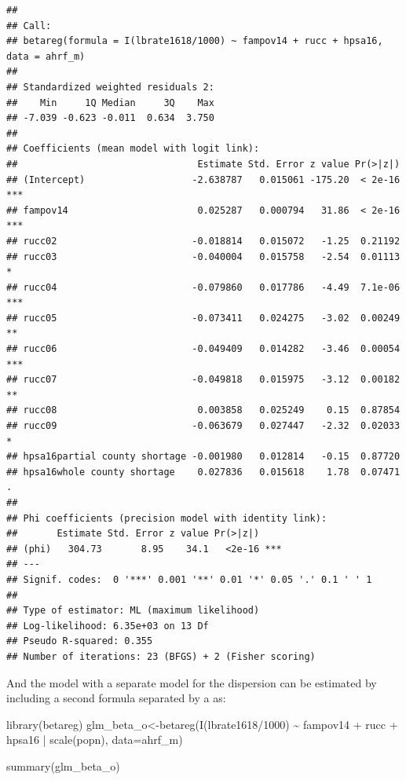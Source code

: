\documentclass[
]{article}
\newenvironment{Shaded}{\begin{snugshade}}{\end{snugshade}}
\newcommand{\AttributeTok}[1]{\textcolor[rgb]{0.77,0.63,0.00}{#1}}
\newcommand{\DecValTok}[1]{\textcolor[rgb]{0.00,0.00,0.81}{#1}}
\newcommand{\FunctionTok}[1]{\textcolor[rgb]{0.00,0.00,0.00}{#1}}
\newcommand{\NormalTok}[1]{#1}
\newcommand{\OtherTok}[1]{\textcolor[rgb]{0.56,0.35,0.01}{#1}}
\newcommand{\SpecialCharTok}[1]{\textcolor[rgb]{0.00,0.00,0.00}{#1}}
\begin{document}
\begin{verbatim}
## 
## Call:
## betareg(formula = I(lbrate1618/1000) ~ fampov14 + rucc + hpsa16, data = ahrf_m)
## 
## Standardized weighted residuals 2:
##    Min     1Q Median     3Q    Max 
## -7.039 -0.623 -0.011  0.634  3.750 
## 
## Coefficients (mean model with logit link):
##                                Estimate Std. Error z value Pr(>|z|)    
## (Intercept)                   -2.638787   0.015061 -175.20  < 2e-16 ***
## fampov14                       0.025287   0.000794   31.86  < 2e-16 ***
## rucc02                        -0.018814   0.015072   -1.25  0.21192    
## rucc03                        -0.040004   0.015758   -2.54  0.01113 *  
## rucc04                        -0.079860   0.017786   -4.49  7.1e-06 ***
## rucc05                        -0.073411   0.024275   -3.02  0.00249 ** 
## rucc06                        -0.049409   0.014282   -3.46  0.00054 ***
## rucc07                        -0.049818   0.015975   -3.12  0.00182 ** 
## rucc08                         0.003858   0.025249    0.15  0.87854    
## rucc09                        -0.063679   0.027447   -2.32  0.02033 *  
## hpsa16partial county shortage -0.001980   0.012814   -0.15  0.87720    
## hpsa16whole county shortage    0.027836   0.015618    1.78  0.07471 .  
## 
## Phi coefficients (precision model with identity link):
##       Estimate Std. Error z value Pr(>|z|)    
## (phi)   304.73       8.95    34.1   <2e-16 ***
## ---
## Signif. codes:  0 '***' 0.001 '**' 0.01 '*' 0.05 '.' 0.1 ' ' 1 
## 
## Type of estimator: ML (maximum likelihood)
## Log-likelihood: 6.35e+03 on 13 Df
## Pseudo R-squared: 0.355
## Number of iterations: 23 (BFGS) + 2 (Fisher scoring)
\end{verbatim}

And the model with a separate model for the dispersion can be estimated by including a second formula separated by a \texttt{\textbar{}} as:

\begin{Shaded}
\begin{Highlighting}[]
\FunctionTok{library}\NormalTok{(betareg)}
\NormalTok{glm\_beta\_o}\OtherTok{\textless{}{-}}\FunctionTok{betareg}\NormalTok{(}\FunctionTok{I}\NormalTok{(lbrate1618}\SpecialCharTok{/}\DecValTok{1000}\NormalTok{) }\SpecialCharTok{\textasciitilde{}}\NormalTok{  fampov14 }\SpecialCharTok{+}\NormalTok{ rucc }\SpecialCharTok{+}\NormalTok{ hpsa16 }\SpecialCharTok{|} \FunctionTok{scale}\NormalTok{(popn), }
                  \AttributeTok{data=}\NormalTok{ahrf\_m)}

\FunctionTok{summary}\NormalTok{(glm\_beta\_o)}
\end{Highlighting}
\end{Shaded}
\end{document}
